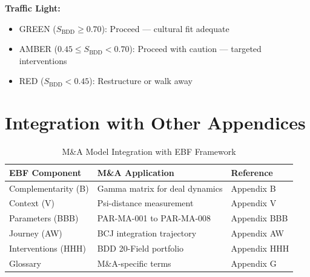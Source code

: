 \textbf{Traffic Light:}
\begin{itemize}[nosep]
    \item GREEN ($S_{\text{BDD}} \geq 0.70$): Proceed --- cultural fit adequate
    \item AMBER ($0.45 \leq S_{\text{BDD}} < 0.70$): Proceed with caution --- targeted interventions
    \item RED ($S_{\text{BDD}} < 0.45$): Restructure or walk away
\end{itemize}


\section{Integration with Other Appendices}
\label{sec:ma-integration}

\begin{table}[htbp]
\centering
\caption{M\&A Model Integration with EBF Framework}
\label{tab:ma-integration}
\begin{tabular}{lll}
\toprule
\textbf{EBF Component} & \textbf{M\&A Application} & \textbf{Reference} \\
\midrule
Complementarity (B)     & Gamma matrix for deal dynamics   & Appendix B \\
Context (V)             & Psi-distance measurement         & Appendix V \\
Parameters (BBB)        & PAR-MA-001 to PAR-MA-008         & Appendix BBB \\
Journey (AW)            & BCJ integration trajectory       & Appendix AW \\
Interventions (HHH)     & BDD 20-Field portfolio           & Appendix HHH \\
Glossary                & M\&A-specific terms              & Appendix G \\
\bottomrule
\end{tabular}
\end{table}

